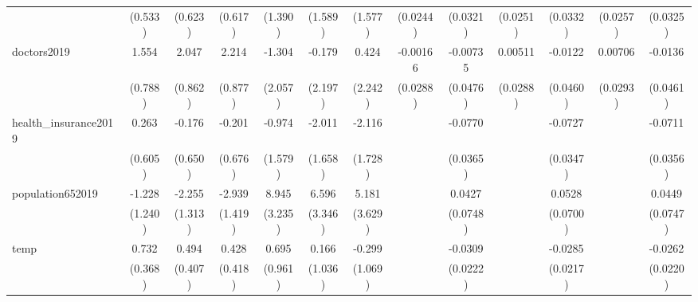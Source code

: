 {\begin{tabular}{l*{12}{c}}
            &     (0.533)         &     (0.623)         &     (0.617)         &     (1.390)         &     (1.589)         &     (1.577)         &    (0.0244)         &    (0.0321)         &    (0.0251)         &    (0.0332)         &    (0.0257)         &    (0.0325)         \\
[1em]
doctors2019 &       1.554\sym{*}  &       2.047\sym{**} &       2.214\sym{**} &      -1.304         &      -0.179         &       0.424         &    -0.00166         &    -0.00735         &     0.00511         &     -0.0122         &     0.00706         &     -0.0136         \\
            &     (0.788)         &     (0.862)         &     (0.877)         &     (2.057)         &     (2.197)         &     (2.242)         &    (0.0288)         &    (0.0476)         &    (0.0288)         &    (0.0460)         &    (0.0293)         &    (0.0461)         \\
[1em]
health\_insurance2019&       0.263         &      -0.176         &      -0.201         &      -0.974         &      -2.011         &      -2.116         &                     &     -0.0770\sym{*}  &                     &     -0.0727\sym{*}  &                     &     -0.0711\sym{*}  \\
            &     (0.605)         &     (0.650)         &     (0.676)         &     (1.579)         &     (1.658)         &     (1.728)         &                     &    (0.0365)         &                     &    (0.0347)         &                     &    (0.0356)         \\
[1em]
population652019&      -1.228         &      -2.255         &      -2.939\sym{*}  &       8.945\sym{**} &       6.596\sym{*}  &       5.181         &                     &      0.0427         &                     &      0.0528         &                     &      0.0449         \\
            &     (1.240)         &     (1.313)         &     (1.419)         &     (3.235)         &     (3.346)         &     (3.629)         &                     &    (0.0748)         &                     &    (0.0700)         &                     &    (0.0747)         \\
[1em]
temp        &       0.732\sym{*}  &       0.494         &       0.428         &       0.695         &       0.166         &      -0.299         &                     &     -0.0309         &                     &     -0.0285         &                     &     -0.0262         \\
            &     (0.368)         &     (0.407)         &     (0.418)         &     (0.961)         &     (1.036)         &     (1.069)         &                     &    (0.0222)         &                     &    (0.0217)         &                     &    (0.0220)         \\

\end{tabular}}
